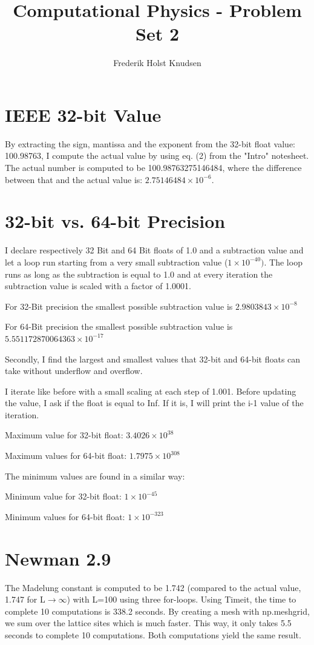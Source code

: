 \documentclass[11pt]{article}
\title{Computational Physics -  Problem Set 2}
\author{Frederik Holst Knudsen}
\begin{document}
\maketitle

\section{IEEE 32-bit Value}
\label{sec:intro}
By extracting the sign, mantissa and the exponent from the 32-bit float value: 100.98763, I compute the actual value by using eq. (2) from the "Intro" notesheet. The actual number is computed to be 100.98763275146484, where the difference between that and the actual value is: 
$2.75146484\times 10^{-6}$.

\section{32-bit vs. 64-bit Precision}
I declare respectively 32 Bit and 64 Bit floats of 1.0 and a subtraction value and let a loop run starting from a very small subtraction value ($1\times10^{-40})$. The loop runs as long as the subtraction is equal to 1.0 and at every iteration the subtraction value is scaled with a factor of 1.0001. 

For 32-Bit precision the smallest possible subtraction value is $2.9803843\times10^{-8}$

For 64-Bit precision the smallest possible subtraction value is $5.551172870064363\times10^{-17}$


Secondly, I find the largest and smallest values that 32-bit and 64-bit floats can take without underflow and overflow. 

I iterate like before with a small scaling at each step of 1.001. Before updating the value, I ask if the float is equal to Inf. If it is, I will print the i-1 value of the iteration.

Maximum value for 32-bit float: $3.4026\times 10^{38}$ 

Maximum values for 64-bit float: $1.7975\times 10^{308}$ 

The minimum values are found in a similar way: 

Minimum value for 32-bit float: $1\times 10^{-45}$ 

Minimum values for 64-bit float: $1\times 10^{-323}$ 


\section{Newman 2.9}
The Madelung constant is computed to be 1.742 (compared to the actual value, 1.747 for L$\to\infty$) with L=100 using three for-loops. Using Timeit, the  time to complete 10 computations is 338.2 seconds. By creating a mesh with np.meshgrid, we sum over the lattice sites which is much faster. This way, it only takes 5.5 seconds to complete 10 computations. Both computations yield the same result. 
\end{document}
